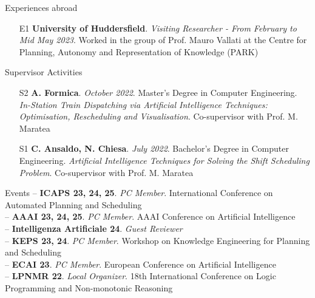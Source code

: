 \documentclass{resume} %
\begin{document}
\begin{rSection}{Experiences abroad}
\begin{enumerate}[leftmargin=5mm]
\item[E1] \textbf{University of Huddersfield}. \textit{Visiting Researcher - From February to Mid May 2023}. Worked in the group of Prof. Mauro Vallati at the Centre for Planning, Autonomy and Representation of Knowledge (PARK)  
\end{enumerate}
\end{rSection}

\pagebreak
\begin{rSection}{Supervisor Activities}
\begin{enumerate}[leftmargin=5mm]
	\item[S2] \textbf{A. Formica}. \textit{October 2022}. Master's Degree in Computer Engineering. \textit{In-Station Train Dispatching via Artificial Intelligence Techniques: Optimisation, Rescheduling and Visualisation}. Co-supervisor with Prof. M. Maratea 
	\item[S1] \textbf{C. Ansaldo, N. Chiesa}. \textit{July 2022}. Bachelor's Degree in Computer Engineering. \textit{Artificial Intelligence Techniques for Solving the Shift Scheduling Problem}. Co-supervisor with Prof. M. Maratea
\end{enumerate}
\end{rSection}



\begin{rSection}{Events}
-- \textbf{ICAPS 23, 24, 25}. \textit{PC Member}. International Conference on Automated Planning and Scheduling \\
-- \textbf{AAAI 23, 24, 25}. \textit{PC Member}. AAAI Conference on Artificial Intelligence \\
-- \textbf{Intelligenza Artificiale 24}. \textit{Guest Reviewer} \\
-- \textbf{KEPS 23, 24}. \textit{PC Member}. Workshop on Knowledge Engineering for Planning and Scheduling \\
-- \textbf{ECAI 23}. \textit{PC Member}. European Conference on Artificial Intelligence \\
-- \textbf{LPNMR 22}. \textit{Local Organizer}. 18th International Conference on Logic Programming and Non-monotonic Reasoning  
\end{rSection}
\end{document}
